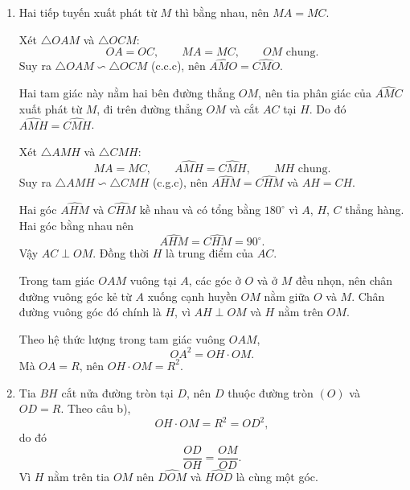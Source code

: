 \begin{bt}[2,5 điểm]
{\begin{enumerate}
Gọi $N$ là trung điểm của $OM$. Lấy điểm $A'$ sao cho $N$ là trung điểm của $AA'$. Hai đường chéo $OM$ và $AA'$ của tứ giác $OAMA'$ cắt nhau tại trung điểm của mỗi đường, nên $OAMA'$ là hình bình hành.

Hình bình hành này có $\widehat{OAM}=90^\circ$, nên $OAMA'$ là hình chữ nhật. Hai đường chéo của hình chữ nhật bằng nhau, do đó
\[
AA'=OM\Rightarrow AN=\dfrac{OM}{2}.
\]
Mà $ON=\dfrac{OM}{2}$, nên $AN=ON$. Vậy $A$ thuộc đường tròn tâm $N$, bán kính $ON$. Đây chính là đường tròn đường kính $OM$.

Chứng minh tương tự, vì tam giác $OCM$ vuông tại $C$ và có cạnh huyền $OM$, điểm $C$ cũng thuộc đường tròn đường kính $OM$.

Hai điểm $O$ và $M$ thuộc đường tròn đó. Vậy bốn điểm $O$, $M$, $A$, $C$ cùng thuộc một đường tròn.

\item Hai tiếp tuyến xuất phát từ $M$ thì bằng nhau, nên $MA=MC$.

Xét $\triangle OAM$ và $\triangle OCM$:
\[
OA=OC,\qquad MA=MC,\qquad OM\text{ chung}.
\]
Suy ra $\triangle OAM\backsim\triangle OCM$ (c.c.c), nên $\widehat{AMO}=\widehat{CMO}$.

Hai tam giác này nằm hai bên đường thẳng $OM$, nên tia phân giác của $\widehat{AMC}$ xuất phát từ $M$, đi trên đường thẳng $OM$ và cắt $AC$ tại $H$. Do đó $\widehat{AMH}=\widehat{CMH}$.

Xét $\triangle AMH$ và $\triangle CMH$:
\[
MA=MC,\qquad \widehat{AMH}=\widehat{CMH},\qquad MH\text{ chung}.
\]
Suy ra $\triangle AMH\backsim\triangle CMH$ (c.g.c), nên $\widehat{AHM}=\widehat{CHM}$ và $AH=CH$.

Hai góc $\widehat{AHM}$ và $\widehat{CHM}$ kề nhau và có tổng bằng $180^\circ$ vì $A$, $H$, $C$ thẳng hàng. Hai góc bằng nhau nên
\[
\widehat{AHM}=\widehat{CHM}=90^\circ.
\]
Vậy $AC\perp OM$. Đồng thời $H$ là trung điểm của $AC$.

Trong tam giác $OAM$ vuông tại $A$, các góc ở $O$ và ở $M$ đều nhọn, nên chân đường vuông góc kẻ từ $A$ xuống cạnh huyền $OM$ nằm giữa $O$ và $M$. Chân đường vuông góc đó chính là $H$, vì $AH\perp OM$ và $H$ nằm trên $OM$.

Theo hệ thức lượng trong tam giác vuông $OAM$,
\[
OA^2=OH\cdot OM.
\]
Mà $OA=R$, nên $OH\cdot OM=R^2$.

\item Tia $BH$ cắt nửa đường tròn tại $D$, nên $D$ thuộc đường tròn $(O)$ và $OD=R$.
Theo câu b),
\[
OH\cdot OM=R^2=OD^2,
\]
do đó
\[
\dfrac{OD}{OH}=\dfrac{OM}{OD}.
\]
Vì $H$ nằm trên tia $OM$ nên $\widehat{DOM}$ và $\widehat{HOD}$ là cùng một góc.


\end{enumerate}}
\end{bt}

